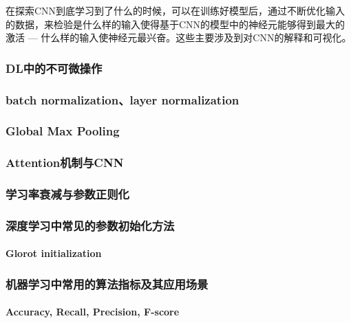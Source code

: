在探索CNN到底学习到了什么的时候，可以在训练好模型后，通过不断优化输入的数据，来检验是什么样的输入使得基于CNN的模型中的神经元能够得到最大的激活 --- 什么样的输入使神经元最兴奋。这些主要涉及到对CNN的解释和可视化。

\subsubsection{DL中的不可微操作}

\subsubsection{batch normalization、layer normalization}

\subsubsection{Global Max Pooling}

\subsubsection{Attention机制与CNN}

\subsubsection{学习率衰减与参数正则化}

\subsubsection{深度学习中常见的参数初始化方法}
\paragraph{Glorot initialization}

\subsubsection{机器学习中常用的算法指标及其应用场景}

\paragraph{Accuracy, Recall, Precision, F-score}

